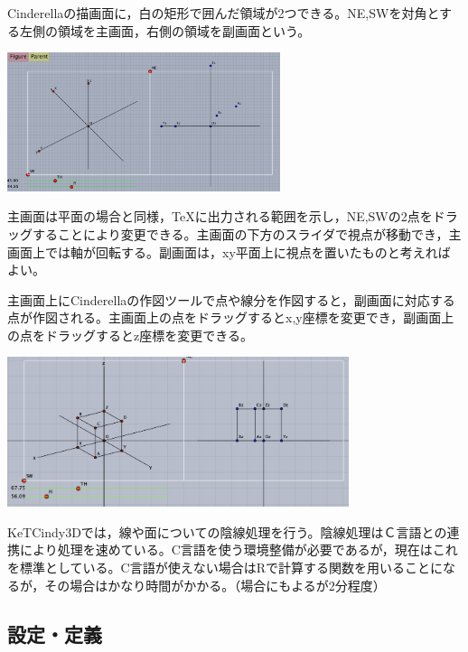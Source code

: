 \documentclass[papersize,a4paper,12pt,uplatex]{jsarticle}
\begin{document}
Cinderellaの描画面に，白の矩形で囲んだ領域が2つできる。NE,SWを対角とする左側の領域を主画面，右側の領域を副画面という。

\vspace{\baselineskip}
\begin{center}
 \includegraphics[bb=0 0 879.05 447.02 , width=8cm]{Fig/3dstart.pdf}
\end{center}
主画面は平面の場合と同様，TeXに出力される範囲を示し，NE,SWの2点をドラッグすることにより変更できる。主画面の下方のスライダで視点が移動でき，主画面上では軸が回転する。副画面は，xy平面上に視点を置いたものと考えればよい。

主画面上にCinderellaの作図ツールで点や線分を作図すると，副画面に対応する点が作図される。主画面上の点をドラッグするとx,y座標を変更でき，副画面上の点をドラッグするとz座標を変更できる。

\vspace{\baselineskip}
\begin{center}
 \includegraphics[bb=0.00 0.00 863.04 378.52 , width=10cm]{Fig/3dscreen.pdf}
\end{center}

KeTCindy3Dでは，線や面についての陰線処理を行う。陰線処理はＣ言語との連携により処理を速めている。C言語を使う環境整備が必要であるが，現在はこれを標準としている。C言語が使えない場合はRで計算する関数を用いることになるが，その場合はかなり時間がかかる。（場合にもよるが2分程度）

\newpage
\subsection{設定・定義}
\end{document}
